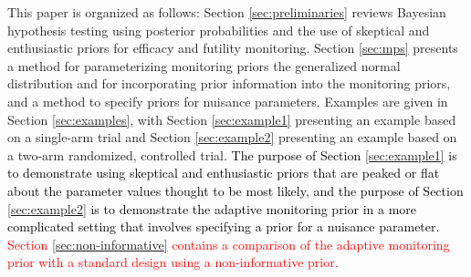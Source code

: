 \documentclass[12pt]{article}
\begin{document}
This paper is organized as follows: %
Section \ref{sec:preliminaries} reviews Bayesian hypothesis testing using posterior probabilities and the use of  skeptical and enthusiastic priors for efficacy and futility monitoring. 
%
Section \ref{sec:mps} presents a method for parameterizing monitoring priors the generalized normal distribution and for incorporating prior information into the monitoring priors, and a method to specify priors for nuisance parameters.
%
Examples are given in Section \ref{sec:examples}, with Section \ref{sec:example1} presenting an example based on a single-arm trial and Section \ref{sec:example2} presenting an example based on a two-arm randomized, controlled trial. \textcolor{black}{The purpose of Section \ref{sec:example1} is to demonstrate using skeptical and enthusiastic priors that are peaked or flat about the parameter values thought to be most likely, and the purpose of Section \ref{sec:example2} is to demonstrate the adaptive monitoring prior in a more complicated setting that involves specifying a prior for a nuisance parameter.} \textcolor{red}{Section \ref{sec:non-informative} contains a comparison of the adaptive monitoring prior with a standard design using a non-informative prior.}
\end{document}
